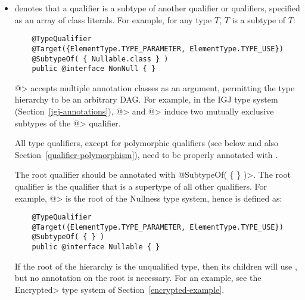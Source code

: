 \begin{itemize}

\item {} denotes that a qualifier is a subtype of
  another qualifier or qualifiers, specified as an array of class
  literals.  For example, for any type $T$,
   $T$ is a subtype of  $T$:

  \begin{Verbatim}
    @TypeQualifier
    @Target({ElementType.TYPE_PARAMETER, ElementType.TYPE_USE})
    @SubtypeOf( { Nullable.class } )
    public @interface NonNull { }
  \end{Verbatim}



  \<@> accepts multiple annotation classes as an argument,
  permitting the type hierarchy to be an arbitrary DAG\@.  For example,
  in the IGJ type system (Section~\ref{igj-annotations}), \<@>
  and \<@> induce two mutually exclusive subtypes of the
  \<@> qualifier.

  All type qualifiers, except for polymorphic qualifiers (see below and
  also Section~\ref{qualifier-polymorphism}), need to be
  properly annotated with .

  The root qualifier should be annotated with
  \<@SubtypeOf( \{ \} )>.  The root qualifier is the qualifier that is
  a supertype of all other qualifiers.  For example, \<@>
  is the root of the Nullness type system, hence is defined as:

  \begin{Verbatim}
    @TypeQualifier
    @Target({ElementType.TYPE_PARAMETER, ElementType.TYPE_USE})
    @SubtypeOf( { } )
    public @interface Nullable { }
  \end{Verbatim}

  If the root of the hierarchy is the unqualified type, then its children
  will use , but no  annotation on the root is necessary.  For an example, see the
  \<Encrypted> type system of Section~\ref{encrypted-example}.


\end{itemize}
